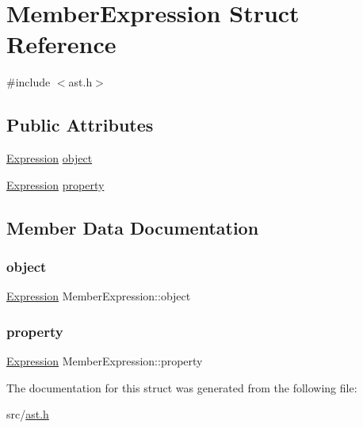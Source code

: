 \hypertarget{struct_member_expression}{}\section{Member\+Expression Struct Reference}
\label{struct_member_expression}


{\ttfamily \#include $<$ast.\+h$>$}

\subsection*{Public Attributes}
\begin{DoxyCompactItemize}
\item 
\hyperlink{ast_8h_a4cb273a4d960cd13ea17d08f254493e8}{Expression} \hyperlink{struct_member_expression_a3fdc12d4070bca0678a5b3e98866fbc3}{object}
\item 
\hyperlink{ast_8h_a4cb273a4d960cd13ea17d08f254493e8}{Expression} \hyperlink{struct_member_expression_a56e5892b8a7b8b7ea863762932a926c3}{property}
\end{DoxyCompactItemize}


\subsection{Member Data Documentation}
\mbox{\label{struct_member_expression_a3fdc12d4070bca0678a5b3e98866fbc3}} 
\subsubsection{\texorpdfstring{object}{object}}
{\footnotesize\ttfamily \hyperlink{ast_8h_a4cb273a4d960cd13ea17d08f254493e8}{Expression} Member\+Expression\+::object}

\mbox{\label{struct_member_expression_a56e5892b8a7b8b7ea863762932a926c3}} 
\subsubsection{\texorpdfstring{property}{property}}
{\footnotesize\ttfamily \hyperlink{ast_8h_a4cb273a4d960cd13ea17d08f254493e8}{Expression} Member\+Expression\+::property}



The documentation for this struct was generated from the following file\+:\begin{DoxyCompactItemize}
\item 
src/\hyperlink{ast_8h}{ast.\+h}\end{DoxyCompactItemize}
